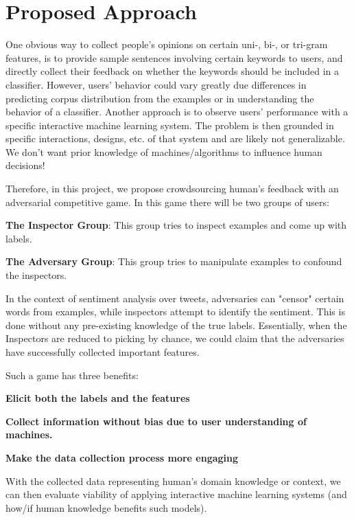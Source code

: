\section{Proposed Approach}

One obvious way to collect people's opinions on certain uni-, bi-, or tri-gram features, is to provide sample sentences involving certain keywords to users, and directly collect their feedback on whether the keywords should be included in a classifier. However, users' behavior could vary greatly due differences in predicting corpus distribution from the examples or in understanding the behavior of a classifier. Another approach is to observe users' performance with a specific interactive machine learning system. The problem is then grounded in specific interactions, designs, etc. of that system and are likely not generalizable. We don't want prior knowledge of machines/algorithms to influence human decisions!

Therefore, in this project, we propose crowdsourcing human's feedback with an adversarial competitive game. In this game there will be two groups of users: 

\begin{compactenum}
\item \textbf{The Inspector Group}: This group tries to inspect examples and come up with labels.
\item \textbf{The Adversary Group}: This group tries to manipulate examples to confound the inspectors.
\end{compactenum}


In the context of sentiment analysis over tweets, adversaries can "censor" certain words from examples, while inspectors attempt to identify the sentiment. This is done without any pre-existing knowledge of the true labels. Essentially, when the Inspectors are reduced to picking by chance, we could claim that the adversaries have successfully collected important features.

Such a game has three benefits:
\begin{compactenum}
	\item \textbf{Elicit both the labels and the features} 
	\item \textbf{Collect information without bias due to user understanding of machines. }
	\item \textbf{Make the data collection process more engaging}
\end{compactenum}
 
With the collected data representing human's domain knowledge or context, we can then evaluate viability of applying interactive machine learning systems (and how/if human knowledge benefits such models).
